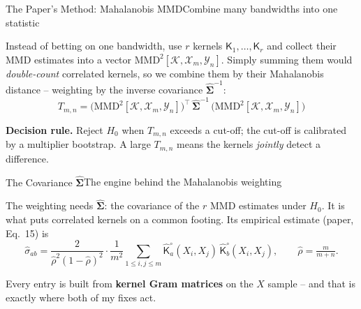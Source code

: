 \documentclass[aspectratio=169,10pt]{beamer}
\newcommand{\sfK}{\mathsf{K}}                      %
\newcommand{\Sig}{\hat{\boldsymbol{\Sigma}}}        %
\newcommand{\mmdvec}{\mathrm{MMD}^2[\mathcal K,\mathcal X_m,\mathcal Y_n]} %
\newcommand{\rhohat}{\hat{\rho}}
\begin{document}
\begin{frame}{The Paper's Method: Mahalanobis MMD}{Combine many bandwidths into one statistic}

\vspace{0.04cm}
Instead of betting on one bandwidth, use $r$ kernels $\sfK_1,\dots,\sfK_r$ and collect their
MMD estimates into a vector $\mmdvec$. Simply summing them would \emph{double-count}
correlated kernels, so we combine them by their Mahalanobis distance -- weighting by the
inverse covariance $\Sig^{-1}$:
\[
  \boxed{\;T_{m,n}=\big(\mmdvec\big)^{\!\top}\,\Sig^{-1}\,\big(\mmdvec\big)\;}
\]

\vspace{0.20cm}
\textbf{Decision rule.} Reject $H_0$ when $T_{m,n}$ exceeds a cut-off; the cut-off is
calibrated by a multiplier bootstrap. A large
$T_{m,n}$ means the kernels \emph{jointly} detect a difference.

\end{frame}

\begin{frame}{The Covariance $\Sig$}{The engine behind the Mahalanobis weighting}

\vspace{0.04cm}
The weighting needs $\Sig$: the covariance of the $r$ MMD estimates under $H_0$. It is
what puts correlated kernels on a common footing. Its empirical estimate (paper, Eq.~15) is
\[
  \hat\sigma_{ab}
  =\frac{2}{\rhohat^{2}(1-\rhohat)^{2}}\cdot\frac{1}{m^{2}}
   \sum_{1\le i,j\le m}\hat{\sfK}^{\circ}_a(X_i,X_j)\,\hat{\sfK}^{\circ}_b(X_i,X_j),
  \qquad \rhohat=\tfrac{m}{m+n}.
\]

\vspace{0.20cm}
Every entry is built from \textbf{kernel Gram matrices} on the $X$ sample -- and that is
exactly where both of my fixes act.

\end{frame}
\end{document}
